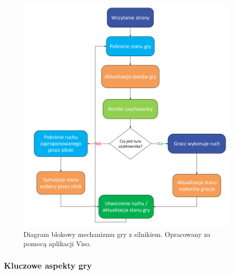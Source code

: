 \documentclass[twoside]{projektInzynierskiMS1}
\begin{document}
\vspace{0.5cm}
\begin{figure}[h!]
    \centering
    \includegraphics[width=1\textwidth]{images/diagram_enggry.png}
    \caption{Diagram blokowy mechanizmu gry z silnikiem. Opracowany za pomocą aplikacji Viso.}
\end{figure}

\newpage

\subsubsection{Kluczowe aspekty gry}
\end{document}

